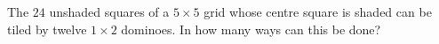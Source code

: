 The $24$ unshaded squares of a $5\times5$ grid whose centre square is shaded can be tiled by twelve $1\times2$ dominoes. In how many ways can this be done?

